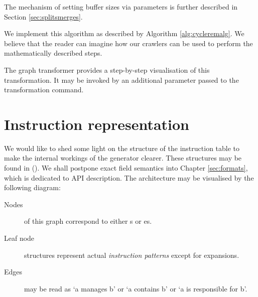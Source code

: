 The mechanism of setting buffer sizes via parameters is further described in Section \ref{sec:splitsmerges}.


We implement this algorithm as described by Algorithm \ref{alg:cycleremalg}. We believe that the reader can imagine how our crawlers can be used to perform the mathematically described steps.

\begin{rem}
  The graph transformer provides a step-by-step visualisation of this transformation. It may be invoked by an additional  parameter passed to the transformation command.
\end{rem}


\section{Instruction representation}

\label{sec:instab}

We would like to shed some light on the structure of the instruction table to make the internal workings of the generator clearer. These structures may be found in (). We shall postpone exact field semantics into Chapter \ref{sec:formats}, which is dedicated to API description. The architecture may be visualised by the following diagram:


\begin{description}
  \item [Nodes] of this graph correspond to either s or es.
  \item [Leaf node] structures represent actual \emph{instruction patterns} except for expansions.
  \item [Edges] may be read as `a manages b' or `a contains b' or `a is responsible for b'.
\end{description}

